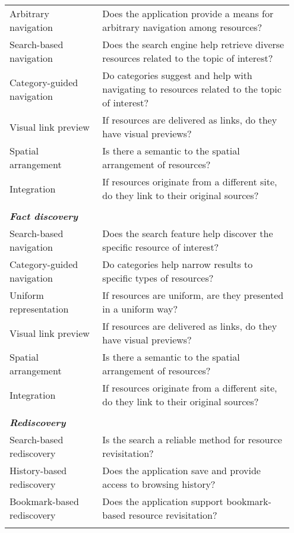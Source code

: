 {\begin{table*}[ht!]
\begin{tabular}{|p{0.31\linewidth}|p{0.64\linewidth}|}
Arbitrary navigation         & Does the application provide a means for arbitrary navigation among resources?                              \\
Search-based navigation      & Does the search engine help retrieve diverse resources related to the topic of interest?               \\
Category-guided navigation & Do categories suggest and help with navigating to resources related to the topic of interest?           \\
Visual link preview               & If resources are delivered as links, do they have visual previews?                                                                        \\
Spatial arrangement          & Is there a semantic to the spatial arrangement of resources?                                                  \\
Integration                  & If resources originate from a different site, do they link to their original sources?                   \\  
&\\
\emph{\textbf{Fact discovery}}                &                                                                                                           \\
Search-based navigation      & Does the search feature help discover the specific resource of interest?                                  \\
Category-guided navigation & Do categories help narrow results to specific types of resources?                                   \\
Uniform representation       & If resources are uniform, are they presented in a uniform way? \\
Visual link preview               & If resources are delivered as links, do they have visual previews?                                                                        \\
Spatial arrangement          & Is there a semantic to the spatial arrangement of resources?                                                    \\
Integration                  & If resources originate from a different site, do they link to their original sources?                   \\
&\\
\emph{\textbf{Rediscovery}}                     &                                                                                                           \\
Search-based rediscovery     & Is the search a reliable method for resource revisitation?                             \\
History-based rediscovery    & Does the application save and provide access to browsing history?                                        \\
Bookmark-based rediscovery   & Does the application support bookmark-based resource revisitation?                                        \\
&\\


\end{tabular}
\end{table*}}

